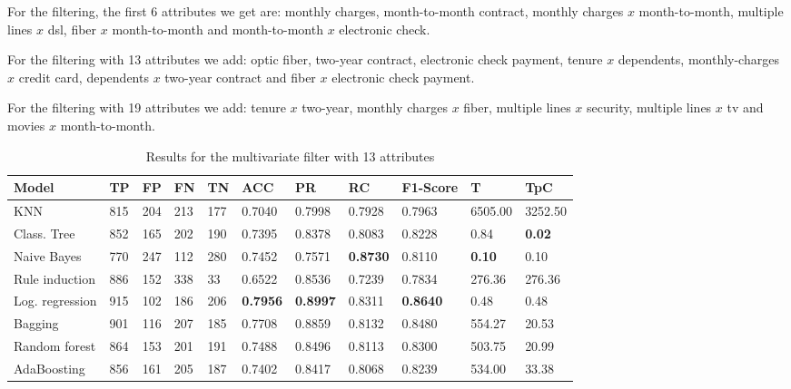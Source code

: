 \documentclass[a4paper,11pt]{article}
\begin{document}
For the filtering, the first 6 attributes we get are: monthly charges, month-to-month contract, monthly charges $x$ month-to-month, multiple lines $x$ dsl, fiber $x$ month-to-month and month-to-month $x$ electronic check.

For the filtering with 13 attributes we add: optic fiber, two-year contract, electronic check payment, tenure $x$ dependents, monthly-charges $x$ credit card, dependents $x$ two-year contract and fiber $x$ electronic check payment.

For the filtering with 19 attributes we add: tenure $x$ two-year, monthly charges $x$ fiber, multiple lines $x$ security, multiple lines $x$ tv and movies $x$ month-to-month.

\begin{table}
\centering
\begin{tabular}{|l|l|l|l|l|l|l|l|l|l|l|}
\hline

\textbf{Model} & \textbf{TP} & \textbf{FP} & \textbf{FN} & \textbf{TN} & \textbf{ACC} & \textbf{PR} & \textbf{RC} & \textbf{F1-Score} & \textbf{T} & \textbf{TpC} \\ \hline
KNN & 815 & 204 & 213 & 177 & 0.7040 & 0.7998 & 0.7928 & 0.7963 & 6505.00 & 3252.50 \\ \hline
Class. Tree & 852 & 165 & 202 & 190 & 0.7395 & 0.8378 & 0.8083 & 0.8228 & 0.84 & \textbf{0.02} \\ \hline
Naive Bayes & 770 & 247 & 112 & 280 & 0.7452 & 0.7571 & \textbf{0.8730} & 0.8110 & \textbf{0.10} & 0.10 \\ \hline
Rule induction & 886 & 152 & 338 & 33 & 0.6522 & 0.8536 & 0.7239 & 0.7834 & 276.36 & 276.36 \\ \hline
Log. regression & 915 & 102 & 186 & 206 & \textbf{0.7956} & \textbf{0.8997} & 0.8311 & \textbf{0.8640} & 0.48 & 0.48 \\ \hline
Bagging & 901 & 116 & 207 & 185 & 0.7708 & 0.8859 & 0.8132 & 0.8480 & 554.27 & 20.53 \\ \hline
Random forest & 864 & 153 & 201 & 191 & 0.7488 & 0.8496 & 0.8113 & 0.8300 & 503.75 & 20.99 \\ \hline
AdaBoosting & 856 & 161 & 205 & 187 & 0.7402 & 0.8417 & 0.8068 & 0.8239 & 534.00 & 33.38 \\ \hline

\end{tabular}
\caption{Results for the multivariate filter with 13 attributes}
\label{class:f50m}
\end{table}
\end{document}
